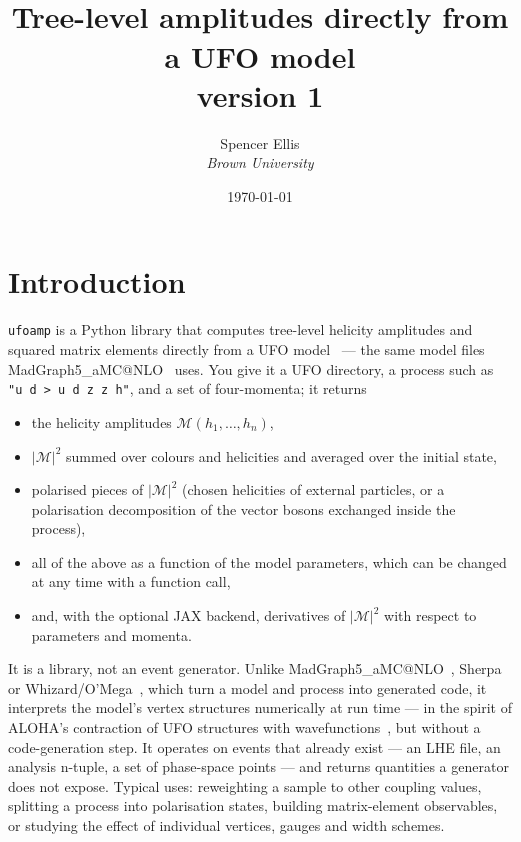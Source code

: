 \documentclass[11pt]{article}
\title{\textbf{\ufoamp}\\[4pt]\large Tree-level amplitudes directly from a UFO model\\[6pt]\normalsize version 1}
\author{Spencer Ellis\\[2pt]\small\textit{Brown University}}
\date{\today}
\makeatletter
\newcommand{\ufoamp}{\texttt{ufoamp}}
\newcommand{\mg}{MadGraph5\_aMC@NLO}
\newcommand{\code}[1]{\texttt{#1}}
\newcommand{\M}{\mathcal{M}}
\makeatother
\begin{document}
\maketitle
\tableofcontents
\newpage

\section{Introduction}
\ufoamp{} is a Python library that computes tree-level helicity amplitudes and squared matrix elements directly from a UFO model~\cite{Degrande:2011ua,Darme:2023jdn} --- the same model files \mg{}~\cite{Alwall:2011uj,Alwall:2014hca} uses. You give it a UFO directory, a process such as \code{"u d > u d z z h"}, and a set of four-momenta; it returns
\begin{itemize}[nosep]
\item the helicity amplitudes $\M(h_1,\dots,h_n)$,
\item $|\M|^2$ summed over colours and helicities and averaged over the initial state,
\item polarised pieces of $|\M|^2$ (chosen helicities of external particles, or a polarisation decomposition of the vector bosons exchanged inside the process),
\item all of the above as a function of the model parameters, which can be changed at any time with a function call,
\item and, with the optional JAX backend, derivatives of $|\M|^2$ with respect to parameters and momenta.
\end{itemize}
It is a library, not an event generator. Unlike \mg{}~\cite{Alwall:2014hca}, Sherpa~\cite{Hoche:2014kca} or Whizard/O'Mega~\cite{Moretti:2001zz}, which turn a model and process into generated code, it interprets the model's vertex structures numerically at run time --- in the spirit of ALOHA's contraction of UFO structures with wavefunctions~\cite{deAquino:2011ub}, but without a code-generation step. It operates on events that already exist --- an LHE file, an analysis n-tuple, a set of phase-space points --- and returns quantities a generator does not expose. Typical uses: reweighting a sample to other coupling values, splitting a process into polarisation states, building matrix-element observables, or studying the effect of individual vertices, gauges and width schemes.
\end{document}
